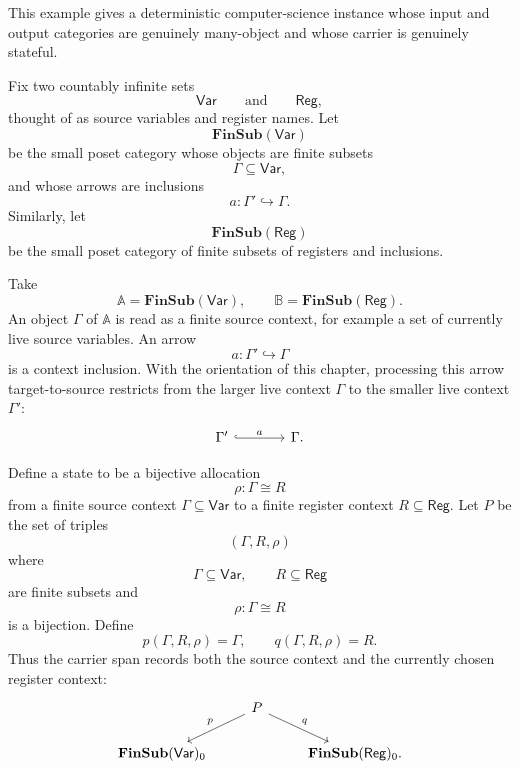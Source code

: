 \begin{example}
\label{example:context-restriction-register-allocation-machines}
    This example gives a deterministic computer-science instance whose input and output categories are genuinely many-object and whose carrier is genuinely stateful.
    
    Fix two countably infinite sets
    \[
        \mathsf{Var}
        \qquad\text{and}\qquad
        \mathsf{Reg},
    \]
    thought of as source variables and register names. Let
    \[
        \mathbf{FinSub}(\mathsf{Var})
    \]
    be the small poset category whose objects are finite subsets
    \[
        \Gamma\subseteq \mathsf{Var},
    \]
    and whose arrows are inclusions
    \[
        a:\Gamma'\hookrightarrow \Gamma.
    \]
    Similarly, let
    \[
        \mathbf{FinSub}(\mathsf{Reg})
    \]
    be the small poset category of finite subsets of registers and inclusions.
    
    Take
    \[
        \mathbb A=\mathbf{FinSub}(\mathsf{Var}),
        \qquad
        \mathbb B=\mathbf{FinSub}(\mathsf{Reg}).
    \]
    An object \(\Gamma\) of \(\mathbb A\) is read as a finite source context, for example a set of currently live source variables. An arrow
    \[
        a:\Gamma'\hookrightarrow \Gamma
    \]
    is a context inclusion. With the orientation of this chapter, processing this arrow target-to-source restricts from the larger live context \(\Gamma\) to the smaller live context \(\Gamma'\):
    \[
        \begin{tikzcd}[column sep=large]
                \Gamma'
                    \arrow[r, hook, "a"]
            &
                \Gamma.
        \end{tikzcd}
    \]
    
    Define a state to be a bijective allocation
    \[
        \rho:\Gamma\cong R
    \]
    from a finite source context \(\Gamma\subseteq\mathsf{Var}\) to a finite register context \(R\subseteq\mathsf{Reg}\). Let \(P\) be the set of triples
    \[
        (\Gamma,R,\rho)
    \]
    where
    \[
        \Gamma\subseteq\mathsf{Var},
        \qquad
        R\subseteq\mathsf{Reg}
    \]
    are finite subsets and
    \[
        \rho:\Gamma\cong R
    \]
    is a bijection. Define
    \[
        p(\Gamma,R,\rho)=\Gamma,
        \qquad
        q(\Gamma,R,\rho)=R.
    \]
    Thus the carrier span records both the source context and the currently chosen register context:
    \[
        \begin{tikzcd}
            &
                P
                    \arrow[dl, "p"']
                    \arrow[dr, "q"]
            &
            \\
                \mathbf{FinSub}(\mathsf{Var})_0
            &
            &
                \mathbf{FinSub}(\mathsf{Reg})_0.
        \end{tikzcd}
    \]
    

\end{example}
